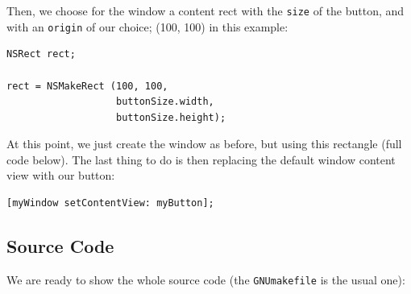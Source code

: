 \documentclass[a4paper]{article}
\begin{document}
Then, we choose for the window a content rect with the \texttt{size}
of the button, and with an \texttt{origin} of our choice; (100, 100)
in this example:
\begin{verbatim}
NSRect rect;

rect = NSMakeRect (100, 100, 
                   buttonSize.width, 
                   buttonSize.height);
\end{verbatim}
At this point, we just create the window as before, but using this
rectangle (full code below).  The last thing to do is then replacing
the default window content view with our button:
\begin{verbatim}
[myWindow setContentView: myButton];
\end{verbatim}

\subsection{Source Code}
We are ready to show the whole source code (the \texttt{GNUmakefile}
is the usual one):
\end{document}
